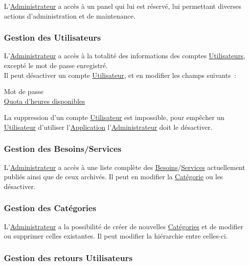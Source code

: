 \documentclass[french,12pt]{article}
\begin{document}
			L’\hyperlink{administrateur}{Administrateur} a accès à un panel qui lui
			 est réservé, lui permettant diverses actions d’administration et de
			 maintenance.

			\subsubsection{Gestion des Utilisateurs}

				L’\hyperlink{administrateur}{Administrateur} a accès à la totalité des
				 informations des comptes \hyperlink{utilisateur}{Utilisateurs}, excepté
				 le mot de passe enregistré.\\
				Il peut désactiver un compte \hyperlink{utilisateur}{Utilisateur}, et en
				 modifier les champs suivants :
				\begin{description}
					\item [Mot de passe]
					\item [\hyperlink{quota}{Quota d’heures disponibles}]
				\end{description}

				La suppression d’un compte \hyperlink{utilisateur}{Utilisateur} est
				 impossible, pour empêcher un \hyperlink{utilisateur}{Utilisateur}
				 d’utiliser l’\hyperlink{application}{Application}
				 l’\hyperlink{administrateur}{Administrateur} doit le désactiver.

			\subsubsection{Gestion des Besoins/Services}

				L’\hyperlink{administrateur}{Administrateur} a accès à une liste
				 complète des \hyperlink{besoin}{Besoins}/\hyperlink{service}{Services}
				 actuellement publiés ainsi que de ceux archivés. Il peut en modifier la
				 \hyperlink{categorie}{Catégorie} ou les désactiver.

			\subsubsection{Gestion des Catégories}

				L’\hyperlink{administrateur}{Administrateur} a la possibilité de créer
				 de nouvelles \hyperlink{categorie}{Catégories} et de modifier ou
				 supprimer celles existantes. Il peut modifier la hiérarchie entre
				 celles-ci.

			\subsubsection{Gestion des retours Utilisateurs}
\end{document}
